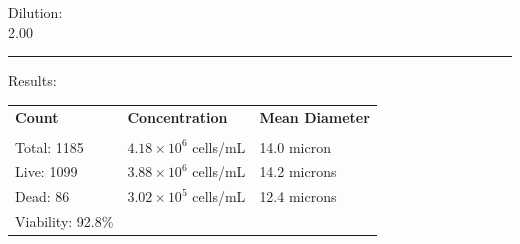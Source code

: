 \documentclass[UTF8,10pt,a4paper,fontset=fandol]{ctexart}
\newcommand{\fieldvalue}[1]{#1}
\begin{document}
\noindent Dilution: \\
\fieldvalue{2.00}

\medskip
\noindent\rule{\textwidth}{0.4pt}

\noindent Results:

\medskip
\begin{tabularx}{\textwidth}{@{}XXX@{}}
\textbf{Count} & \textbf{Concentration} & \textbf{Mean Diameter} \\
\underline{\hspace{0.9\linewidth}} &
\underline{\hspace{0.9\linewidth}} &
\underline{\hspace{0.9\linewidth}} \\[2pt]
Total:
\fieldvalue{1185}
&
\fieldvalue{$4.18 \times 10^{6}$ cells/mL}
&
\fieldvalue{14.0 micron}
\\
Live:
\fieldvalue{1099}
&
\fieldvalue{$3.88 \times 10^{6}$ cells/mL}
&
\fieldvalue{14.2 microns}
\\
Dead:
\fieldvalue{86}
&
\fieldvalue{$3.02 \times 10^{5}$ cells/mL}
&
\fieldvalue{12.4 microns}
\\
Viability:
\fieldvalue{92.8\%}
&
&
\end{tabularx}

\medskip

\begin{center}
\begin{minipage}{0.43\textwidth}
\centering
{}
\end{minipage}
\hfill
\begin{minipage}{0.43\textwidth}
\centering
{}
\end{minipage}

\vspace{0.4cm}

\begin{minipage}{0.43\textwidth}
\centering
{}
\end{minipage}
\hfill
\begin{minipage}{0.43\textwidth}
\centering
{}
\end{minipage}
\end{center}
\end{document}

